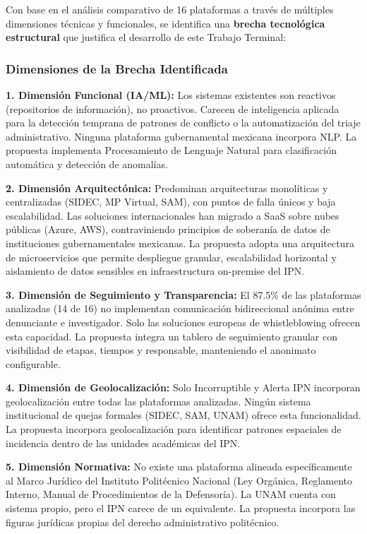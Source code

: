 \begin{flushleft}
\justifying

Con base en el análisis comparativo de 16 plataformas a través de múltiples dimensiones técnicas y funcionales, se identifica una \textbf{brecha tecnológica estructural} que justifica el desarrollo de este Trabajo Terminal:

\subsubsection*{Dimensiones de la Brecha Identificada}

\textbf{1. Dimensión Funcional (IA/ML):} Los sistemas existentes son reactivos (repositorios de información), no proactivos. Carecen de inteligencia aplicada para la detección temprana de patrones de conflicto o la automatización del triaje administrativo. Ninguna plataforma gubernamental mexicana incorpora NLP. La propuesta implementa Procesamiento de Lenguaje Natural para clasificación automática y detección de anomalías.

\textbf{2. Dimensión Arquitectónica:} Predominan arquitecturas monolíticas y centralizadas (SIDEC, MP Virtual, SAM), con puntos de falla únicos y baja escalabilidad. Las soluciones internacionales han migrado a SaaS sobre nubes públicas (Azure, AWS), contraviniendo principios de soberanía de datos de instituciones gubernamentales mexicanas. La propuesta adopta una arquitectura de microservicios que permite despliegue granular, escalabilidad horizontal y aislamiento de datos sensibles en infraestructura on-premise del IPN.

\textbf{3. Dimensión de Seguimiento y Transparencia:} El 87.5\% de las plataformas analizadas (14 de 16) no implementan comunicación bidireccional anónima entre denunciante e investigador. Solo las soluciones europeas de whistleblowing ofrecen esta capacidad. La propuesta integra un tablero de seguimiento granular con visibilidad de etapas, tiempos y responsable, manteniendo el anonimato configurable.

\textbf{4. Dimensión de Geolocalización:} Solo Incorruptible y Alerta IPN incorporan geolocalización entre todas las plataformas analizadas. Ningún sistema institucional de quejas formales (SIDEC, SAM, UNAM) ofrece esta funcionalidad. La propuesta incorpora geolocalización para identificar patrones espaciales de incidencia dentro de las unidades académicas del IPN.

\textbf{5. Dimensión Normativa:} No existe una plataforma alineada específicamente al Marco Jurídico del Instituto Politécnico Nacional (Ley Orgánica, Reglamento Interno, Manual de Procedimientos de la Defensoría). La UNAM cuenta con sistema propio, pero el IPN carece de un equivalente. La propuesta incorpora las figuras jurídicas propias del derecho administrativo politécnico.


\end{flushleft}
